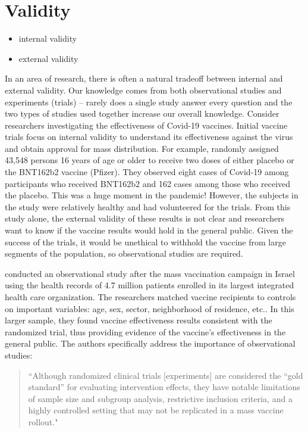 \documentclass[
]{book}
\begin{document}
\hypertarget{validity}{%
\section{Validity}\label{validity}}

\begin{itemize}
\item
  internal validity
\item
  external validity
\end{itemize}

In an area of research, there is often a natural tradeoff between internal and external validity. Our knowledge comes from both observational studies and experiments (trials) -- rarely does a single study answer every question and the two types of studies used together increase our overall knowledge. Consider researchers investigating the effectiveness of Covid-19 vaccines. Initial vaccine trials focus on internal validity to understand its effectiveness against the virus and obtain approval for mass distribution. For example, \citet{polack2020safety} randomly assigned 43,548 persons 16 years of age or older to receive two doses of either placebo or the BNT162b2 vaccine (Pfizer). They observed eight cases of Covid-19 among participants who received BNT162b2 and 162 cases among those who received the placebo. This was a huge moment in the pandemic! However, the subjects in the study were relatively healthy and had volunteered for the trials. From this study alone, the external validity of these results is not clear and researchers want to know if the vaccine results would hold in the general public. Given the success of the trials, it would be unethical to withhold the vaccine from large segments of the population, so observational studies are required.

\citet{dagan2021bnt162b2} conducted an observational study after the mass vaccination campaign in Israel using the health records of 4.7 million patients enrolled in its largest integrated health care organization. The researchers matched vaccine recipients to controls on important variables: age, sex, sector, neighborhood of residence, etc.. In this larger sample, they found vaccine effectiveness results consistent with the randomized trial, thus providing evidence of the vaccine's effectiveness in the general public. The authors specifically address the importance of observational studies:

\begin{quote}
``Although randomized clinical trials {[}experiments{]} are considered the ``gold standard'' for evaluating intervention effects, they have notable limitations of sample size and subgroup analysis, restrictive inclusion criteria, and a highly controlled setting that may not be replicated in a mass vaccine rollout."
\end{quote}
\end{document}
